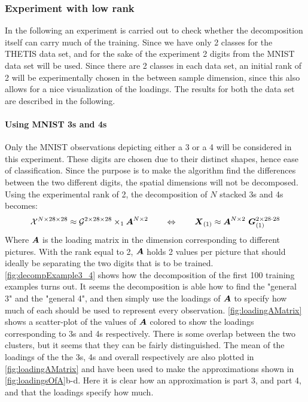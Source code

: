 \subsubsection{Experiment with low rank} \label{tex:result_experiment}
In the following an experiment is carried out to check whether the decomposition itself can carry much of the training. Since we have only 2 classes for the THETIS data set, and for the sake of the experiment 2 digits from the MNIST data set will be used. Since there are 2 classes in each data set, an initial rank of 2 will be experimentally chosen in the between sample dimension, since this also allows for a nice visualization of the loadings. The results for both the data set are described in the following.

\paragraph{Using MNIST 3s and 4s}
Only the MNIST observations depicting either a 3 or a 4 will be considered in this experiment. These digits are chosen due to their distinct shapes, hence ease of classification. Since the purpose is to make the algorithm find the differences between the two different digits, the spatial dimensions will not be decomposed. Using the experimental rank of 2, the decomposition of $N$ stacked 3s and 4s becomes:
\begin{equation}
    \tensor{X}^{N\times 28\times 28} \approx \tensor{G}^{2 \times 28 \times 28} \times_1 \bs{A}^{N\times 2} \qquad \Leftrightarrow \qquad \bs{X}_{(1)} \approx \bs{A}^{N\times 2} \ \bs{G}^{2 \times 28\cdot 28}_{(1)}
\end{equation}
Where $\boldsymbol{A}$ is the loading matrix in the dimension corresponding to different pictures. With the rank equal to 2, $\boldsymbol{A}$ holds 2 values per picture that should ideally be separating the two digits that is to be trained. \autoref{fig:decompExample3_4} shows how the decomposition of the first 100 training examples turns out. It seems the decomposition is able how to find the "general 3" and the "general 4", and then simply use the loadings of $\boldsymbol{A}$ to specify how much of each should be used to represent every observation. \autoref{fig:loadingAMatrix} shows a scatter-plot of the values of $\boldsymbol{A}$ colored to show the loadings corresponding to 3s and 4s respectively. There is some overlap between the two clusters, but it seems that they can be fairly distinguished. The mean of the loadings of the the 3s, 4s and overall respectively are also plotted in \autoref{fig:loadingAMatrix} and have been used to make the approximations shown in \autoref{fig:loadingsOfA}b-d. Here it is clear how an approximation is part 3, and part 4, and that the loadings specify how much.
